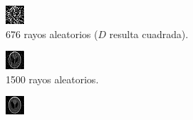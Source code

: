\documentclass[a4paper]{article}
\begin{document}
\begin{figure}
\begin{subfigure}{0.4\linewidth}
  \centering
  \includegraphics[width=0.6\linewidth]{rayos/phantom-aleat676}
  \caption{676 rayos aleatorios ($D$ resulta cuadrada).}
\end{subfigure}%
\begin{subfigure}{0.4\linewidth}
  \centering
  \includegraphics[width=0.6\linewidth]{rayos/phantom-aleat1500}
  \caption{1500 rayos aleatorios.}
\end{subfigure}
\begin{subfigure}{0.4\linewidth}
  \centering
  \includegraphics[width=0.6\linewidth]{rayos/phantom-aleat4000}

\end{subfigure}
\end{figure}
\end{document}
